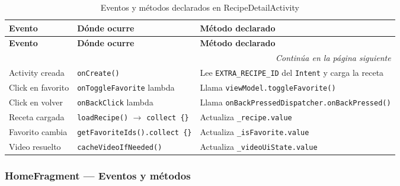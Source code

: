\documentclass[stu, 12pt, letterpaper, donotrepeattitle, floatsintext, natbib]{apa7}
\begin{document}
\begin{longtable}{@{}p{2.5cm}p{4cm}p{9cm}@{}}
\caption{Eventos y métodos declarados en RecipeDetailActivity}
\label{tab:evrecipedetail}\\
\toprule
\textbf{Evento} & \textbf{Dónde ocurre} & \textbf{Método declarado} \\
\midrule
\endfirsthead
\toprule
\textbf{Evento} & \textbf{Dónde ocurre} & \textbf{Método declarado} \\
\midrule
\endhead
\midrule
\multicolumn{3}{r}{\small\textit{Continúa en la página siguiente}}\\
\endfoot
\bottomrule
\endlastfoot
Activity creada & \texttt{onCreate()} & Lee \texttt{EXTRA\_RECIPE\_ID} del \texttt{Intent} y carga la receta \\[3pt]
Click en favorito & \texttt{onToggleFavorite} lambda & Llama \texttt{viewModel.toggleFavorite()} \\[3pt]
Click en volver & \texttt{onBackClick} lambda & Llama \texttt{onBackPressedDispatcher.onBackPressed()} \\[3pt]
Receta cargada & \texttt{loadRecipe()} $\rightarrow$ \texttt{collect \{\}} & Actualiza \texttt{\_recipe.value} \\[3pt]
Favorito cambia & \texttt{getFavoriteIds().collect \{\}} & Actualiza \texttt{\_isFavorite.value} \\[3pt]
Video resuelto & \texttt{cacheVideoIfNeeded()} & Actualiza \texttt{\_videoUiState.value} \\
\end{longtable}

\subsubsection{HomeFragment --- Eventos y métodos}
\end{document}
